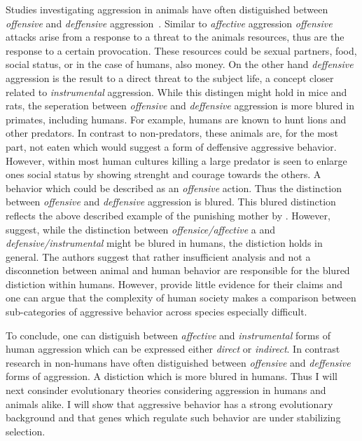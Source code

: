 Studies investigating aggression in animals have often distiguished between \textit{offensive} and \textit{deffensive} aggression~\cite{Blanchard2005b}.
Similar to \textit{affective} aggression \textit{offensive} attacks arise from a response to a threat to the animals resources, thus are the response to a certain provocation.
These resources could be sexual partners, food, social status, or in the case of humans, also money.
On the other hand \textit{deffensive} aggression is the result to a direct threat to the subject life, a concept closer related to \textit{instrumental} aggression.
While this distingen might hold in mice and rats, the seperation between \textit{offensive} and \textit{deffensive} aggression is more blured in primates, including humans.
For example, humans are known to hunt lions and other predators.
In contrast to non-predators, these animals are, for the most part, not eaten which would suggest a form of deffensive aggressive behavior.
However, within most human cultures killing a large predator is seen to enlarge ones social status by showing strenght and courage towards the others.
A behavior which could be described as an \textit{offensive} action.
Thus the distinction between \textit{offensive} and \textit{deffensive} aggression is blured.
This blured distinction reflects the above described example of the punishing mother by \citet{Geen2001}.
However, \citet{Blanchard2005b} suggest, while the distinction between \textit{offensice/affective} a and \textit{defensive/instrumental} might be blured in humans, the distiction holds in general.
The authors suggest that rather insufficient analysis and not a disconnetion between animal and human behavior are responsible for the blured distiction within humans.
However, \citet{Blanchard2005b} provide little evidence for their claims and one can argue that the complexity of human society makes a comparison between sub-categories of aggressive behavior across species especially difficult. 

To conclude, one can distiguish between \textit{affective} and \textit{instrumental} forms of human aggression which can be expressed either \textit{direct} or \textit{indirect}.
In contrast research in non-humans have often distiguished between \textit{offensive} and \textit{deffensive} forms of aggression.
A distiction which is more blured in humans.
Thus I will next consinder evolutionary theories considering aggression in humans and animals alike.
I will show that aggressive behavior has a strong evolutionary background and that genes which regulate such behavior are under stabilizing selection.

